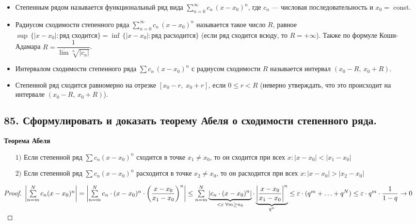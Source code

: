 \documentclass[a4paper, fleqn]{article}
\begin{document}
    \begin{itemize}
        \item Степенным рядом называется функциональный ряд вида $\sum \limits_{n = 0}^{\infty} c_n \, (x - x_0)^n$, 
	где $c_n$ --- числовая последовательность и $x_0 =$ const.

        \item Радиусом сходимости степенного ряда $\sum \limits_{n = 0}^{\infty} c_n \, (x - x_0)^n$ называется такое число $R$, 
	равное \\ ${\sup \, \bigl\{|x - x_0| : \text{ряд сходится}\bigr\}} = {\inf \, \bigl\{|x - x_0| : \text{ряд расходится}\bigr\}}$ 
	(если ряд сходится всюду, то ${R = +\infty}$). Также по формуле Коши-Адамара $R = \dfrac1{\overline{\lim} \sqrt[n]{|c_n|}}$.

        \item Интервалом сходимости степенного ряда $\sum c_n \, (x - x_0)^n$ с радиусом сходимости $R$ называется интервал $(x_0 - R, \: x_0 + R)$.

        \item Степенной ряд сходится равномерно на отрезке $[x_0 - r, \; x_0 + r]$, если $0 \leqslant r < R$ 
	(неверно утверждать, что это происходит на интервале $(x_0 - R, \: x_0 + R)$). 
    \end{itemize}
        
        
    \subsection*{85. Сформулировать и доказать теорему Абеля о сходимости степенного ряда.}
	\textbf{ Теорема Абеля} \\[-15 pt] 
	\begin{enumerate}
	\item[$1)$] Если степенной ряд $\sum c_n (x - x_0)^n$ сходится в точке $x_1 \ne x_0$, 
	то он сходится при всех $x : |x - x_0| < |x_1 - x_0|$
	\item[$2)$] Если степенной ряд $\sum c_n (x - x_0)^n$ расходится в точке $x_2 \ne x_0$, 
	то он расходится при всех $x : |x - x_0| > |x_2 - x_0|$\\[-30 pt]
	\end{enumerate}
	\begin{proof}
	$\left| \sum\limits_{n = m}^N c_n (x - x_0)^n \right| = 
	\left| \sum\limits_{n = m}^N c_n \cdot (x - x_0)^n \cdot \left( \dfrac{x - x_0}{x_1 - x_0} \right)^n \right| \le  \\[3 pt]
	\sum\limits_{n = m}^N \underbrace{\left| c_n \cdot (x - x_0)^n \right|}_{< \varepsilon \; \forall m \ge n_0} \cdot 
	\underbrace{\left| \dfrac{x - x_0}{x_1 - x_0} \right|^n}_{q^n}  \le
	\varepsilon \cdot (q^m + \ldots + q^N) \le \varepsilon \cdot q^m \cdot \dfrac1{1 - q} \to 0$
	\end{proof}    
    
\end{document}

